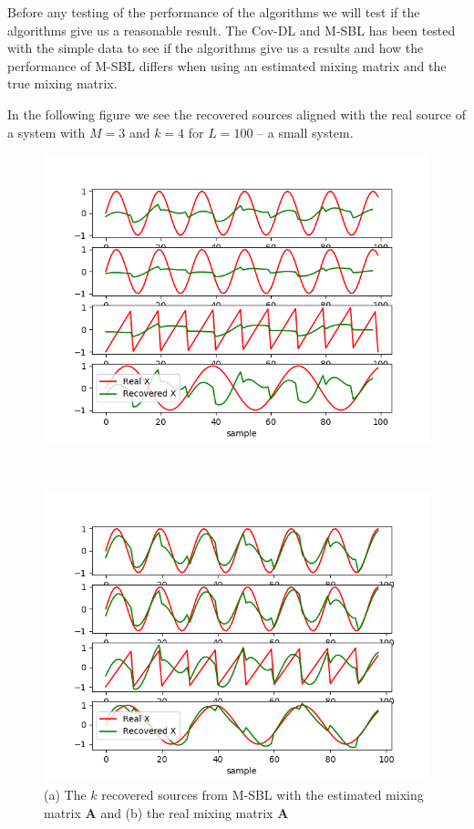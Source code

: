 Before any testing of the performance of the algorithms we will test if the algorithms give us a reasonable result. The Cov-DL and M-SBL has been tested with the simple data to see if the algorithms give us a results and how the performance of M-SBL differs when using an estimated mixing matrix and the true mixing matrix.

In the following figure we see the recovered sources aligned with the real source of a system with $M = 3$ and $k = 4$ for $L = 100$ -- a small system.
\begin{figure}[H]
    \begin{minipage}{0.5\linewidth}
    	\centering
        \includegraphics[scale=0.5]{figures/chapter6/test_of_algo_mix_data.png}
		\subcaption{}
    \end{minipage} 
    ~\hfill~
    \begin{minipage}{0.5\linewidth}
    	\centering
        \includegraphics[scale=0.5]{figures/chapter6/test_of_algo_mix_data_realA.png}
        \subcaption{}
    \end{minipage}
    \caption{(a) The $k$ recovered sources from M-SBL with the estimated mixing matrix $\mathbf{A}$ and (b) the real mixing matrix $\mathbf{A}$}
    \label{fig:test_toy}
\end{figure}
